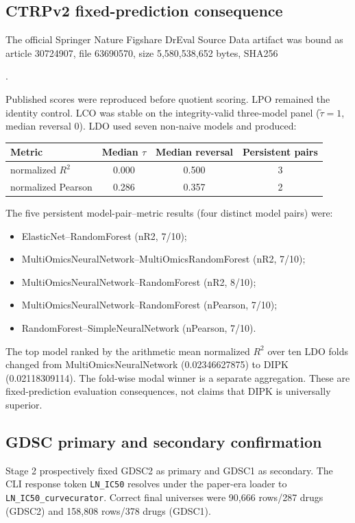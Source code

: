 \documentclass[11pt]{article}
\begin{document}
\subsection{CTRPv2 fixed-prediction consequence}
The official Springer Nature Figshare DrEval Source Data artifact was bound as article 30724907, file 63690570, size 5,580,538,652 bytes, SHA256
\begin{center}\small
\texttt{}.
\end{center}
Published scores were reproduced before quotient scoring. LPO remained the identity control. LCO was stable on the integrity-valid three-model panel ($\tilde\tau=1$, median reversal $0$). LDO used seven non-naive models and produced:
\begin{center}
\begin{tabular}{@{}lccc@{}}
\toprule
Metric & Median $\tau$ & Median reversal & Persistent pairs \\
\midrule
normalized $R^2$ & 0.000 & 0.500 & 3 \\
normalized Pearson & 0.286 & 0.357 & 2 \\
\bottomrule
\end{tabular}
\end{center}
The five persistent model-pair--metric results (four distinct model pairs) were:
\begin{itemize}
\item ElasticNet--RandomForest (nR2, 7/10);
\item MultiOmicsNeuralNetwork--MultiOmicsRandomForest (nR2, 7/10);
\item MultiOmicsNeuralNetwork--RandomForest (nR2, 8/10);
\item MultiOmicsNeuralNetwork--RandomForest (nPearson, 7/10);
\item RandomForest--SimpleNeuralNetwork (nPearson, 7/10).
\end{itemize}
The top model ranked by the arithmetic mean normalized $R^2$ over ten LDO folds changed from MultiOmicsNeuralNetwork (0.02346627875) to DIPK (0.02118309114). The fold-wise modal winner is a separate aggregation. These are fixed-prediction evaluation consequences, not claims that DIPK is universally superior.


\subsection{GDSC primary and secondary confirmation}
Stage 2 prospectively fixed GDSC2 as primary and GDSC1 as secondary. The CLI response token \texttt{LN\_IC50} resolves under the paper-era loader to \texttt{LN\_IC50\_curvecurator}. Correct final universes were 90,666 rows/287 drugs (GDSC2) and 158,808 rows/378 drugs (GDSC1).
\end{document}
